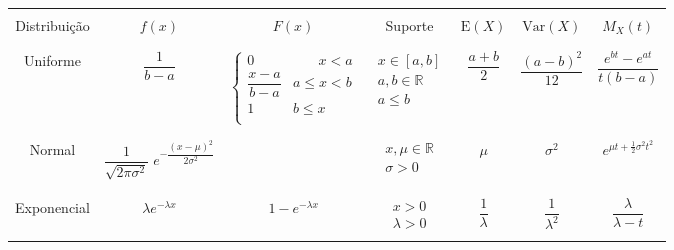 \documentclass[12pt]{article}
\begin{document}
\begin{tabular}{| c | c | c | c | c | c | c |}

	                               \hline \rule{0pt}{0pt} & & & & & & \\
	Distribuição &
	$f(x)$ &
	$F(x)$ &
	Suporte &
	$\text{E}(X)$ &
	$\text{Var}(X)$ &
	$M_X(t)$ \\

	\rule{0pt}{0pt} & & & & & & \\ \hline \rule{0pt}{0pt} & & & & & & \\

	Uniforme &
	$\dfrac{1}{b - a}$ &
	$\begin{cases}
		0                    & \quad\;\;\; x < a \\
		\dfrac{x - a}{b - a} &      a \leq x < b \\
		1                    &      b \leq x \\
	\end{cases}$ &
	$\begin{matrix}
		x \in [a,b] \\
		a,b \in \mathds R \\
		a \leq b \\
	\end{matrix}$ &
	$\dfrac{a + b}{2}$ &
	$\dfrac{(a - b)^2}{12}$ &
	$\dfrac{e^{bt} - e^{at}}{t(b - a)}$ \\

	\rule{0pt}{0pt} & & & & & & \\ \hline \rule{0pt}{0pt} & & & & & & \\

	Normal &
	$\dfrac{1}{\sqrt{2 \pi \sigma^2}} \; e^{-\dfrac{(x - \mu)^2}{2 \sigma^2}}$ &
	&
	$\begin{matrix}
		x,\mu \in \mathds R \\
		\sigma > 0 \\
	\end{matrix}$ &
	$\mu$ &
	$\sigma^2$ &
	$e^{\mu t + \frac{1}{2} \sigma^2 t^2}$ \\

	\rule{0pt}{0pt} & & & & & & \\ \hline \rule{0pt}{0pt} & & & & & & \\

	Exponencial &
	$\lambda e^{-\lambda x}$ &
	$1 - e^{-\lambda x}$ &
	$\begin{matrix}
		x       > 0 \\
		\lambda > 0 \\
	\end{matrix}$ &
	$\dfrac{1}{\lambda}$ &
	$\dfrac{1}{\lambda^2}$ &
	$\dfrac{\lambda}{\lambda - t}$ \\


\end{tabular}
\end{document}
